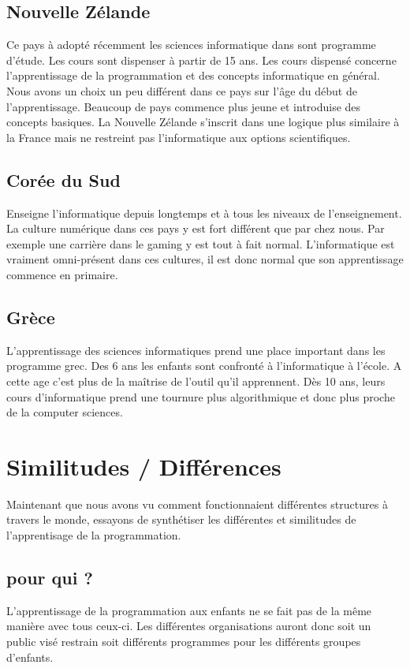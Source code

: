 \subsection{Nouvelle Zélande}
Ce pays à adopté récemment les sciences informatique dans sont programme d'étude. Les cours sont dispenser à partir de 15 ans. Les cours dispensé concerne l'apprentissage de la programmation et des concepts informatique en général. Nous avons un choix un peu différent dans ce pays sur l'âge du début de l'apprentissage. Beaucoup de pays commence plus jeune et introduise des concepts basiques. La Nouvelle Zélande s'inscrit dans une logique plus similaire à la France mais ne restreint pas l'informatique aux options scientifiques.

\subsection{Corée du Sud}
Enseigne l'informatique depuis longtemps et à tous les niveaux de l'enseignement. La culture numérique dans ces pays y est fort différent que par chez nous. Par exemple une carrière dans le gaming y est tout à fait normal. L'informatique est vraiment omni-présent dans ces cultures, il est donc normal que son apprentissage commence en primaire.

\subsection{Grèce}
L'apprentissage des sciences informatiques prend une place important dans les programme grec. Des 6 ans les enfants sont confronté à l'informatique à l'école. A cette age c'est plus de la maîtrise de l'outil qu'il apprennent. Dès 10 ans, leurs cours d'informatique prend une tournure plus algorithmique et donc plus proche de la computer sciences.

\section{Similitudes / Différences}
Maintenant que nous avons vu comment fonctionnaient différentes structures à travers le monde, essayons de synthétiser les différentes et similitudes de l'apprentisage de la programmation.
\subsection{pour qui ?}
L'apprentissage de la programmation aux enfants ne se fait pas de la même manière avec tous ceux-ci. Les différentes organisations auront donc soit un public visé restrain soit différents programmes pour les différents groupes d'enfants. 

